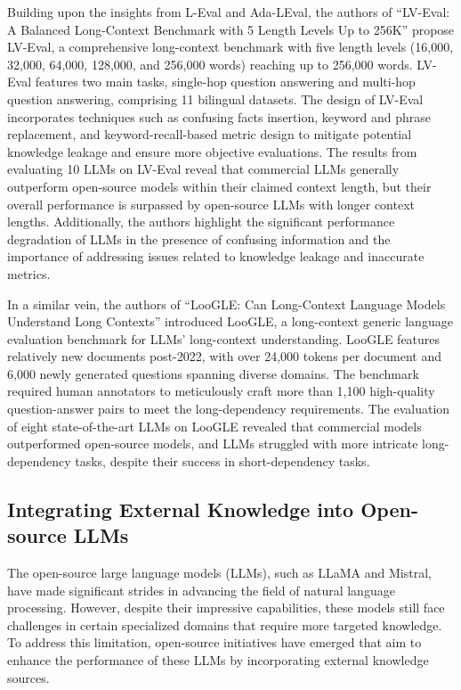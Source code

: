 \documentclass[11pt]{article}
\begin{document}
Building upon the insights from L-Eval and Ada-LEval, the authors of ``LV-Eval: A Balanced Long-Context Benchmark with 5 Length Levels Up to 256K'' \cite{ref324} propose LV-Eval, a comprehensive long-context benchmark with five length levels (16,000, 32,000, 64,000, 128,000, and 256,000 words) reaching up to 256,000 words. LV-Eval features two main tasks, single-hop question answering and multi-hop question answering, comprising 11 bilingual datasets. The design of LV-Eval incorporates techniques such as confusing facts insertion, keyword and phrase replacement, and keyword-recall-based metric design to mitigate potential knowledge leakage and ensure more objective evaluations. The results from evaluating 10 LLMs on LV-Eval reveal that commercial LLMs generally outperform open-source models within their claimed context length, but their overall performance is surpassed by open-source LLMs with longer context lengths. Additionally, the authors highlight the significant performance degradation of LLMs in the presence of confusing information and the importance of addressing issues related to knowledge leakage and inaccurate metrics.

In a similar vein, the authors of ``LooGLE: Can Long-Context Language Models Understand Long Contexts'' \cite{ref12} introduced LooGLE, a long-context generic language evaluation benchmark for LLMs' long-context understanding. LooGLE features relatively new documents post-2022, with over 24,000 tokens per document and 6,000 newly generated questions spanning diverse domains. The benchmark required human annotators to meticulously craft more than 1,100 high-quality question-answer pairs to meet the long-dependency requirements. The evaluation of eight state-of-the-art LLMs on LooGLE revealed that commercial models outperformed open-source models, and LLMs struggled with more intricate long-dependency tasks, despite their success in short-dependency tasks.

\subsection{Integrating External Knowledge into Open-source LLMs}

The open-source large language models (LLMs), such as LLaMA and Mistral, have made significant strides in advancing the field of natural language processing. However, despite their impressive capabilities, these models still face challenges in certain specialized domains that require more targeted knowledge. To address this limitation, open-source initiatives have emerged that aim to enhance the performance of these LLMs by incorporating external knowledge sources.
\end{document}
